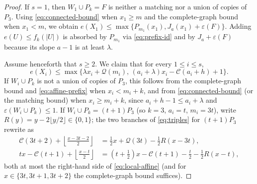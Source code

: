 \documentclass[10pt]{article}
\theoremstyle{compactplain}
\theoremstyle{remark}\newtheorem{remark}[theorem]{Remark}
\begin{document}
\begin{proof}
If $s=1$, then $W_1\cup P_k=F$ is neither a matching nor a union of
copies of $P_3$. Using \eqref{eq:connected-bound} when $x_1\ge m$ and
the complete-graph bound when $x_1<m$, we obtain
$e(X_1)\le\max\{P_{m_1}(x_1),J_a(x_1)+\varepsilon(F)\}$. Adding
$e(U)\le f_k(|U|)$ is absorbed by $P_{m_1}$ via \eqref{eq:prefix-id} and
by $J_a+\varepsilon(F)$ because its slope $a-1$ is at least $\lambda$.

Assume henceforth that $s\ge2$. We claim that for every $1\le i\le s$,
\begin{equation}\label{eq:local-affine}
 e(X_i)\le\max\bigl\{\lambda x_i+\mathcal{Q}(m_i),\,
 (a_i+\lambda)x_i-\mathcal{C}(a_i+h)+1\bigr\}.
\end{equation}
If $W_i\cup P_k$ is not a union of copies of $P_3$, this follows from
the complete-graph bound and \eqref{eq:affine-prefix} when
$x_i<m_i+k$, and from \eqref{eq:connected-bound} (or the matching bound)
when $x_i\ge m_i+k$, since $a_i+h-1\le a_i+\lambda$ and
$\varepsilon(W_i\cup P_k)\le1$. If $W_i\cup P_k=(t+1)P_3$ (so $k=3$,
$a_i=t$, $m_i=3t$), write $R(y)=y-2\lfloor y/2\rfloor\in\{0,1\}$; the
two branches of \eqref{eq:triples} for $(t+1)P_3$ rewrite as
\begin{align*}
 \mathcal{C}(3t+2)+\left\lfloor\frac{x-3t-2}{2}\right\rfloor
 &=\frac{1}{2}x+\mathcal{Q}(3t)-\frac{1}{2}R(x-3t),\\
 tx-\mathcal{C}(t+1)+\left\lfloor\frac{x-t}{2}\right\rfloor
 &=\left(t+\frac{1}{2}\right)x-\mathcal{C}(t+1)-\frac{t}{2}
  -\frac{1}{2}R(x-t),
\end{align*}
both at most the right-hand side of \eqref{eq:local-affine} (and for
$x\in\{3t,3t+1,3t+2\}$ the complete-graph bound suffices).


\end{proof}
\end{document}

